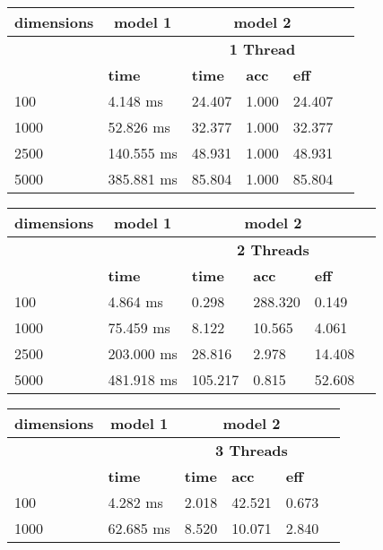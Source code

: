\documentclass{article}
\begin{document}
\begin{table}
\begin{tabular}{|l|l|l|l|l|l|}\hline
\multicolumn{1}{|c|}{\textbf{dimensions}} &\multicolumn{1}{|c|}{\textbf{model 1}} &\multicolumn{3}{|c|}{\textbf{model 2}}\\ \hline
& & \multicolumn{3}{c|}{\textbf{1 Thread}} \\ \hline
& \textbf{time} & \textbf{time} & \textbf{acc} & \textbf{eff}\\ \hline
100
 & 4.148 ms & 24.407 & 1.000 & 24.407\\ \hline
1000
 & 52.826 ms & 32.377 & 1.000 & 32.377\\ \hline
2500
 & 140.555 ms & 48.931 & 1.000 & 48.931\\ \hline
5000
 & 385.881 ms & 85.804 & 1.000 & 85.804\\ \hline
\end{tabular}
\end{table}\begin{table}
\begin{tabular}{|l|l|l|l|l|l|}\hline
\multicolumn{1}{|c|}{\textbf{dimensions}} &\multicolumn{1}{|c|}{\textbf{model 1}} &\multicolumn{3}{|c|}{\textbf{model 2}}\\ \hline
& & \multicolumn{3}{c|}{\textbf{2 Threads}} \\ \hline
& \textbf{time} & \textbf{time} & \textbf{acc} & \textbf{eff}\\ \hline
100
 & 4.864 ms & 0.298 & 288.320 & 0.149\\ \hline
1000
 & 75.459 ms & 8.122 & 10.565 & 4.061\\ \hline
2500
 & 203.000 ms & 28.816 & 2.978 & 14.408\\ \hline
5000
 & 481.918 ms & 105.217 & 0.815 & 52.608\\ \hline
\end{tabular}
\end{table}\begin{table}
\begin{tabular}{|l|l|l|l|l|l|}\hline
\multicolumn{1}{|c|}{\textbf{dimensions}} &\multicolumn{1}{|c|}{\textbf{model 1}} &\multicolumn{3}{|c|}{\textbf{model 2}}\\ \hline
& & \multicolumn{3}{c|}{\textbf{3 Threads}} \\ \hline
& \textbf{time} & \textbf{time} & \textbf{acc} & \textbf{eff}\\ \hline
100
 & 4.282 ms & 2.018 & 42.521 & 0.673\\ \hline
1000
 & 62.685 ms & 8.520 & 10.071 & 2.840\\ \hline

\end{tabular}
\end{table}
\end{document}
